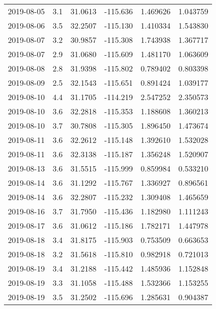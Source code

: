 \begin{tabular}{lrrrrr}
2019-08-05 &       3.1 &  31.0613 &  -115.636 &         1.469626 &         1.043759 \\
2019-08-06 &       3.5 &  32.2507 &  -115.130 &         1.410334 &         1.543830 \\
2019-08-07 &       3.2 &  30.9857 &  -115.308 &         1.743938 &         1.367717 \\
2019-08-07 &       2.9 &  31.0680 &  -115.609 &         1.481170 &         1.063609 \\
2019-08-08 &       2.8 &  31.9398 &  -115.802 &         0.789402 &         0.803398 \\
2019-08-09 &       2.5 &  32.1543 &  -115.651 &         0.891424 &         1.039177 \\
2019-08-10 &       4.4 &  31.1705 &  -114.219 &         2.547252 &         2.350573 \\
2019-08-10 &       3.6 &  32.2818 &  -115.353 &         1.188608 &         1.360213 \\
2019-08-10 &       3.7 &  30.7808 &  -115.305 &         1.896450 &         1.473674 \\
2019-08-11 &       3.6 &  32.2612 &  -115.148 &         1.392610 &         1.532028 \\
2019-08-11 &       3.6 &  32.3138 &  -115.187 &         1.356248 &         1.520907 \\
2019-08-13 &       3.6 &  31.5515 &  -115.999 &         0.859984 &         0.533210 \\
2019-08-14 &       3.6 &  31.1292 &  -115.767 &         1.336927 &         0.896561 \\
2019-08-14 &       3.6 &  32.2807 &  -115.232 &         1.309408 &         1.465659 \\
2019-08-16 &       3.7 &  31.7950 &  -115.436 &         1.182980 &         1.111243 \\
2019-08-17 &       3.6 &  31.0612 &  -115.186 &         1.782171 &         1.447978 \\
2019-08-18 &       3.4 &  31.8175 &  -115.903 &         0.753509 &         0.663653 \\
2019-08-18 &       3.2 &  31.5618 &  -115.810 &         0.982918 &         0.721013 \\
2019-08-19 &       3.4 &  31.2188 &  -115.442 &         1.485936 &         1.152848 \\
2019-08-19 &       3.3 &  31.1058 &  -115.488 &         1.532366 &         1.153255 \\
2019-08-19 &       3.5 &  31.2502 &  -115.696 &         1.285631 &         0.904387 \\

\end{tabular}
